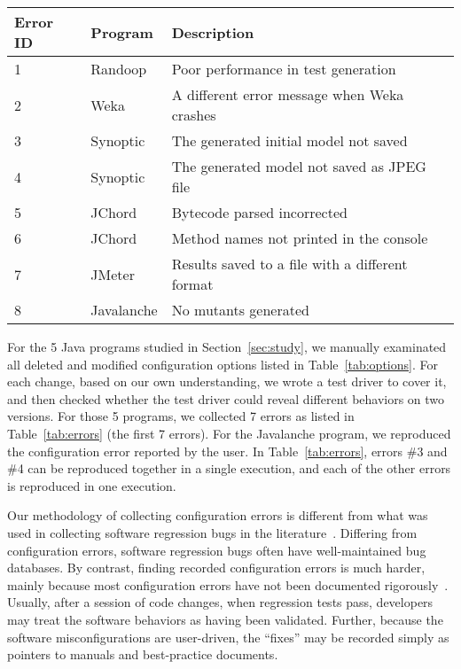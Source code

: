 \begin{table}[t]
\vspace{1mm}
\centering
\small{
\setlength{\tabcolsep}{.80\tabcolsep}
\begin{tabular}{|l||l|l|}
\hline
 Error ID& Program & Description\\
 \hline
 \hline
 1 & Randoop  & Poor performance in test generation\\
 2 & Weka &  A different error message when Weka crashes\\
 3 & Synoptic & The generated initial model not saved\\
 4 & Synoptic & The generated model not saved as JPEG file \\
 5 & JChord & Bytecode parsed incorrected \\
 6 & JChord &  Method names not printed in the console\\
 7 & JMeter &  Results saved to a file with a different format\\
 8 & Javalanche &  No mutants generated\\
\hline
\end{tabular}
}
\vspace{-2mm}
\end{table}



For the 5 Java programs studied in Section~\ref{sec:study},
we manually examinated all deleted and modified configuration
options listed in Table~\ref{tab:options}. For each
change, based on our own understanding, we wrote a test driver to cover
it, and then checked whether the test driver
could reveal different behaviors on two versions.
For those 5 programs, we collected 7 errors as listed in
Table~\ref{tab:errors} (the first 7 errors).
For the Javalanche program, we reproduced the configuration
error reported by the user.
In Table~\ref{tab:errors}, errors \#3 and \#4
can be reproduced together in a single execution, and each of the other
errors is reproduced in one execution.

Our methodology of collecting
configuration errors is different from what was used in
collecting software regression bugs in the literature~\cite{dd, autoflow}.
Differing from configuration errors,
software regression bugs often have well-maintained
bug databases. By contrast, finding recorded configuration errors
is much harder, mainly because most configuration errors have not been
documented rigorously~\cite{Yin:2011:ESC}. Usually, after a
session of code changes, when regression tests pass, developers
may treat the software behaviors as having been validated. Further,
because the software misconfigurations are user-driven,
the ``fixes'' may be recorded simply as pointers
to manuals and best-practice documents. 

